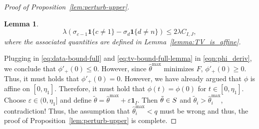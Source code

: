 \documentclass[10pt,a4paper]{amsart}
\newtheorem{lemma}{Lemma}
\newcommand{\cS}{\mathcal{S}}
\newcommand{\one}{\mathbf 1}
\begin{document}
\begin{proof}[Proof of Proposition~\ref{lem:perturb-upper}]
\begin{lemma}\label{lemma:tv-bound-full-lemma}
    \begin{equation}\label{eq:tv-bound-full-lemma}
\lambda(\sigma_{c-1}\one\{c\neq 1\}-\sigma_d\one\{d\neq n\})\le 2\lambda C_{I,J},
\end{equation}
where the associated quantities are defined in Lemma~\ref{lemma:TV_is_affine}.
\end{lemma}
Plugging in \eqref{eq:data-bound-full} and \eqref{eq:tv-bound-full-lemma} in \eqref{eqn:phi_deriv}, we conclude that $\phi'_+(0)\le 0$. However, since $\hat\theta^{\max}$ minimizes $F$, $\phi'_+(0)\ge 0$. Thus, it must holds that $\phi'_+(0)=0$.
However, we have already argued that $\phi$ is affine on $[0,\eta_1]$. Therefore, it must hold that $\phi(t)=\phi(0)$ for $t\in[0,\eta_1]$. Choose $\varepsilon\in(0,\eta_1]$ and define
$\tilde\theta=\hat\theta^{\max}+\varepsilon\one_I$.
Then $\tilde\theta\in\mathcal \cS$ and
$\tilde\theta_i>\hat\theta_i^{\max}$,
contradiction! Thus, the assumption that $\hat\theta_i^{\max}<q$ must be wrong and thus, the proof of Proposition~\ref{lem:perturb-upper} is complete.
\end{proof}
\end{document}
